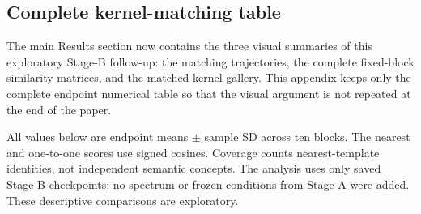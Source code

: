 \begin{landscape}
\section{Complete kernel-matching table}\label{app:kernel-matching}

The main Results section now contains the three visual summaries of this exploratory Stage-B follow-up: the matching trajectories, the complete fixed-block similarity matrices, and the matched kernel gallery. This appendix keeps only the complete endpoint numerical table so that the visual argument is not repeated at the end of the paper.

All values below are endpoint means $\pm$ sample SD across ten blocks. The nearest and one-to-one scores use signed cosines. Coverage counts nearest-template identities, not independent semantic concepts. The analysis uses only saved Stage-B checkpoints; no spectrum or frozen conditions from Stage A were added. These descriptive comparisons are exploratory.


\end{landscape}
